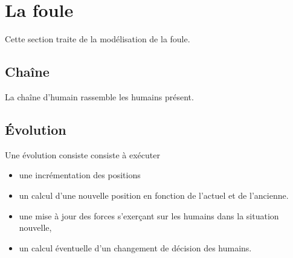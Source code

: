 %
\section{La foule}
%
Cette section traite de la modélisation de la foule.
%
\subsection{Chaîne}
La chaîne d'humain rassemble les humains présent.
%
\subsection{Évolution}
Une évolution consiste consiste à exécuter
\begin{itemize}[leftmargin=1cm, label=, itemsep=0pt]%
\item  une incrémentation des positions
\item  un calcul d'une nouvelle position en fonction de l'actuel et de l'ancienne.
\item  une mise à jour des forces s'exerçant sur les humains dans la situation nouvelle,
\item  un calcul éventuelle d'un changement de décision des humains.
\end{itemize}
%
